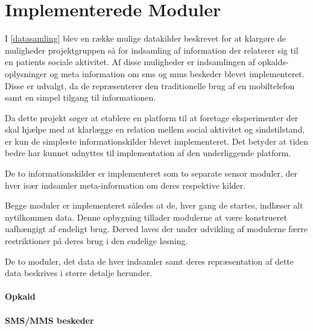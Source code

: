 \section{Implementerede Moduler}
I \cref{datasamling} blev en række mulige datakilder beskrevet for at klargøre de muligheder projektgruppen så for indsamling af information der relaterer sig til en patients sociale aktivitet.
Af disse muligheder er indsamlingen af opkalds-oplysninger og meta information om sms og mms beskeder blevet implementeret.
Disse er udvalgt, da de repræsenterer den traditionelle brug af en mobiltelefon samt en simpel tilgang til informationen.

Da dette projekt søger at etablere en platform til at foretage eksperimenter der skal hjælpe med at klarlægge en relation mellem social aktivitet og sindstilstand, er kun de simpleste informationskilder blevet implementeret.
Det betyder at tiden bedre har kunnet udnyttes til implementation af den underliggende platform.

De to informationskilder er implementeret som to separate sensor moduler, der hver især indsamler meta-information om deres respektive kilder.

Begge moduler er implementeret således at de, hver gang de startes, indlæser alt nytilkommen data.
Denne opbygning tillader modulerne at være konstrueret uafhængigt af endeligt brug.
Derved laves der under udvikling af modulerne færre restriktioner på deres brug i den endelige løsning.

De to moduler, det data de hver indsamler samt deres repræsentation af dette data beskrives i større detalje herunder.


\paragraph{Opkald}
\paragraph{SMS/MMS beskeder}